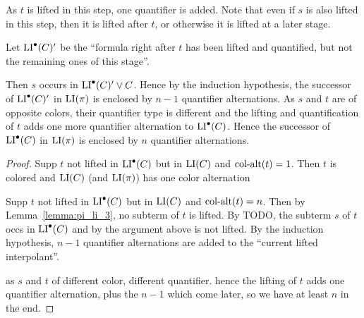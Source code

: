 \documentclass[%
	draft=false,%
	numbers=noendperiod,%
	11pt,%
	a4paper,%
	oneside,%
	openany,%
]{memoir}
\begin{document}
{
	\color{gray}
	As $t$ is lifted in this step, one quantifier is added.
	Note that even if $s$ is also lifted in this step, then it is lifted after $t$, or otherwise it is lifted at a later stage.

	Let $\operatorname{LI}^\bullet(C)'$ be the ``formula right after $t$ has been lifted and quantified, but not the remaining ones of this stage''.

	Then $s$ occurs in $\operatorname{LI}^\bullet(C)' \lor C$.
	Hence by the induction hypothesis, the successor of $\operatorname{LI}^\bullet(C)'$ in $\operatorname{LI}(\pi)$ is enclosed by $n-1$ quantifier alternations.
	As $s$ and $t$ are of opposite colors, their quantifier type is different and the lifting and quantification of $t$ adds one more quantifier alternation to $\operatorname{LI}^\bullet(C)$. 
	Hence the successor of $\operatorname{LI}^\bullet(C)$ in $\operatorname{LI}(\pi)$ is enclosed by $n$ quantifier alternations.
}

{
	\color{gray}

	\begin{proof}
		Supp $t$ not lifted in $\operatorname{LI}^\bullet(C)$ but in $\operatorname{LI}(C)$ and $\operatorname{col-alt}(t) = 1$.
		Then $t$ is colored and $\operatorname{LI}(C)$ (and $\operatorname{LI}(\pi)$) has one color alternation

		Supp $t$ not lifted in $\operatorname{LI}^\bullet(C)$ but in $\operatorname{LI}(C)$ and $\operatorname{col-alt}(t) = n$.
		Then by Lemma~\ref{lemma:pi_li_3}, no subterm of $t$ is lifted.
		By TODO, the subterm $s$ of $t$ occs in $\operatorname{LI}^\bullet(C)$ and by the argument above is not lifted.
		By the induction hypothesis, $n-1$ quantifier alternations are added to the ``current lifted interpolant''.

		as $s$ and $t$ of different color, different quantifier.
		hence the lifting of $t$ adds one quantifier alternation, plus the $n-1$ which come later, so we have at least $n$ in the end.
	\end{proof}
}
\end{document}

